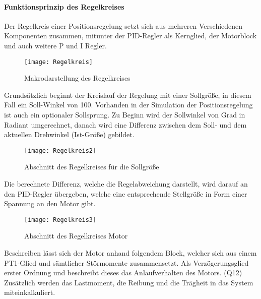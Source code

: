 \documentclass[titlepage,12pt,twoside]{article}
\begin{document}
\paragraph{Funktionsprinzip des Regelkreises}
\hfill \break
\hfill \break
Der Regelkreis einer Positionsregelung setzt sich aus mehreren Verschiedenen 
Komponenten zusammen, mitunter der PID-Regler als Kernglied, der Motorblock und 
auch weitere P und I Regler. \\
\begin{figure}[H]
	\begin{center}
		\scalebox{1.2}
		{\texttt{[image: Regelkreis]}}
		\caption{Makrodarstellung des Regelkreises}
		\label{fig:Regelkreis}
	\end{center}
\end{figure}
\hfill \break
Grundsätzlich beginnt der Kreislauf der Regelung mit einer Sollgröße, in diesem Fall 
ein Soll-Winkel von 100\textdegree. Vorhanden in der Simulation der Positionsregelung ist auch 
ein optionaler Sollsprung. Zu Beginn wird der Sollwinkel von Grad in Radiant 
umgerechnet, danach wird eine Differenz zwischen dem Soll- und dem aktuellen 
Drehwinkel (Ist-Größe) gebildet. \\
\begin{figure}[H]
	\begin{center}
		\scalebox{1}
		{\texttt{[image: Regelkreis2]}}
		\caption{Abschnitt des Regelkreises für die Sollgröße}
		\label{fig:Regelkreis2}
	\end{center}
\end{figure}
\hfill \break
Die berechnete Differenz, welche die Regelabweichung darstellt, wird darauf an den 
PID-Regler übergeben, welche eine entsprechende Stellgröße in Form einer Spannung an 
den Motor gibt. \\
\begin{figure}[H]
	\begin{center}
		\scalebox{1}
		{\texttt{[image: Regelkreis3]}}
		\caption{Abschnitt des Regelkreises Motor}
		\label{fig:Regelkreis3}
	\end{center}
\end{figure}
\hfill \break
Beschreiben lässt sich der Motor anhand folgendem Block, welcher sich aus einem 
PT1-Glied und sämtlicher Störmomente zusammensetzt. Als Verzögerungsglied erster 
Ordnung und beschreibt dieses das Anlaufverhalten des Motors. (Q12) Zusätzlich werden 
das Lastmoment, die Reibung und die Trägheit in das System miteinkalkuliert. \\
\end{document}
